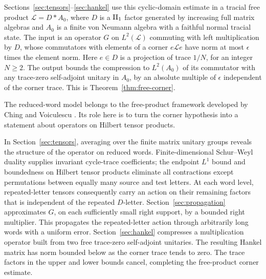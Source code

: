 Sections~\ref{sec:tensors}--\ref{sec:hankel} use this cyclic-domain
estimate in a tracial free product \(\mathcal L=D*A_0\), where \(D\)
is a \({\rm II}_1\) factor generated by increasing full matrix
algebras and \(A_0\) is a finite von Neumann algebra with a faithful
normal tracial state. The input is an operator \(G\) on
\(L^2(\mathcal L)\) commuting with left multiplication by \(D\),
whose commutators with elements of a corner \(e\mathcal L e\)
have norm at most \(\epsilon\) times the element norm. Here
\(e\in D\) is a projection of trace \(1/N\), for an integer
\(N\ge2\). The output bounds the compression to \(L^2(A_0)\) of its
commutator with any trace-zero self-adjoint unitary in \(A_0\), by
an absolute multiple of \(\epsilon\) independent of the corner
trace. This is Theorem~\ref{thm:free-corner}.

The reduced-word model belongs to the free-product framework developed
by Ching and Voiculescu \citep{Ching1973,Voiculescu1985}.
Its role here is to turn the corner hypothesis into a statement about
operators on Hilbert tensor products.

In Section~\ref{sec:tensors}, averaging over the finite matrix unitary
groups reveals the structure of the operator on reduced words.
Finite-dimensional Schur--Weyl
duality supplies invariant cycle-trace coefficients; the endpoint
\(L^1\) bound and boundedness on Hilbert tensor products eliminate all
contractions except permutations between equally many source and test
letters. At each word level, repeated-letter tensors consequently carry an
action on their remaining factors that is independent of the repeated
$D$-letter. Section~\ref{sec:propagation} approximates
\(G\), on each sufficiently small right support, by a bounded right
multiplier. This propagates the repeated-letter action through
arbitrarily long words with a uniform error.
Section~\ref{sec:hankel} compresses a multiplication operator built
from two free trace-zero self-adjoint unitaries. The resulting Hankel
matrix has norm bounded below as the corner trace tends to zero.
The trace factors in the upper and lower bounds cancel, completing
the free-product corner estimate.

